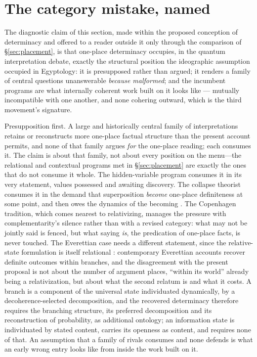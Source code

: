 \section{The category mistake, named}\label{sec:mistake}

The diagnostic claim of this section, made within the proposed conception of determinacy and offered to a reader outside it only through the comparison of \S\ref{sec:placement}, is that one-place determinacy occupies, in the quantum interpretation debate, exactly the structural position the ideographic assumption occupied in Egyptology: it is presupposed rather than argued; it renders a family of central questions unanswerable \emph{because malformed}; and the incumbent programs are what internally coherent work built on it looks like --- mutually incompatible with one another, and none cohering outward, which is the third movement's signature.

Presupposition first. A large and historically central family of interpretations retains or reconstructs more one-place factual structure than the present account permits, and none of that family argues \emph{for} the one-place reading; each consumes it. The claim is about that family, not about every position on the menu---the relational and contextual programs met in \S\ref{sec:placement} are exactly the ones that do not consume it whole. The hidden-variable program consumes it in its very statement, values possessed and awaiting discovery. The collapse theorist consumes it in the demand that superposition \emph{become} one-place definiteness at some point, and then owes the dynamics of the becoming \cite{ghirardi1986unified}. The Copenhagen tradition, which comes nearest to relativizing, manages the pressure with complementarity's silence rather than with a revised category: what may not be jointly said is fenced, but what saying \emph{is}, the predication of one-place facts, is never touched. The Everettian case needs a different statement, since the relative-state formulation is itself relational \cite{everett1957relative}: contemporary Everettian accounts recover definite outcomes within branches, and the disagreement with the present proposal is not about the number of argument places, ``within its world'' already being a relativization, but about what the second relatum is and what it costs. A branch is a component of the universal state individuated dynamically, by a decoherence-selected decomposition, and the recovered determinacy therefore requires the branching structure, its preferred decomposition and its reconstruction of probability, as additional ontology; an information state is individuated by stated content, carries its openness as content, and requires none of that. An assumption that a family of rivals consumes and none defends is what an early wrong entry looks like from inside the work built on it.

